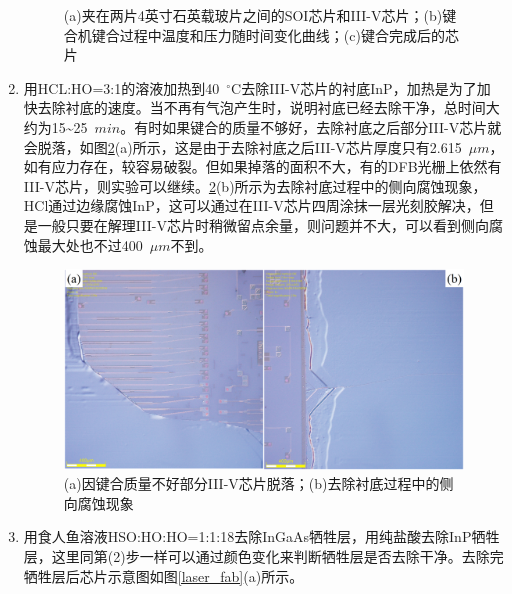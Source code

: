 \begin{enumerate}[(1)]
\begin{figure}[htb]
		\captionsetup{justification=centering}
		\caption{(a)夹在两片4英寸石英载玻片之间的SOI芯片和III-V芯片；(b)键合机键合过程中温度和压力随时间变化曲线；(c)键合完成后的芯片}
		\label{laser_bonder}
	\end{figure}
	\item 
	用HCL:HO=3:1的溶液加热到40~$^{\circ}$C去除III-V芯片的衬底InP，加热是为了加快去除衬底的速度。当不再有气泡产生时，说明衬底已经去除干净，总时间大约为15\~{}25~$min$。有时如果键合的质量不够好，去除衬底之后部分III-V芯片就会脱落，如图\ref{laser_sub_removal}(a)所示，这是由于去除衬底之后III-V芯片厚度只有2.615~$\mu m$，如有应力存在，较容易破裂。但如果掉落的面积不大，有的DFB光栅上依然有III-V芯片，则实验可以继续。\ref{laser_sub_removal}(b)所示为去除衬底过程中的侧向腐蚀现象，HCl通过边缘腐蚀InP，这可以通过在III-V芯片四周涂抹一层光刻胶解决，但是一般只要在解理III-V芯片时稍微留点余量，则问题并不大，可以看到侧向腐蚀最大处也不过400~$\mu m$不到。
	\begin{figure}[htb]
		\centering
		\includegraphics[width=14cm]{./Pictures/laser_sub_removal.jpg}
		\captionsetup{justification=centering}
		\caption{(a)因键合质量不好部分III-V芯片脱落；(b)去除衬底过程中的侧向腐蚀现象}
		\label{laser_sub_removal}
	\end{figure}
	\item 
	用食人鱼溶液HSO:HO:HO=1:1:18去除InGaAs牺牲层，用纯盐酸去除InP牺牲层，这里同第(2)步一样可以通过颜色变化来判断牺牲层是否去除干净。去除完牺牲层后芯片示意图如图\ref{laser_fab}(a)所示。
	

\end{enumerate}
